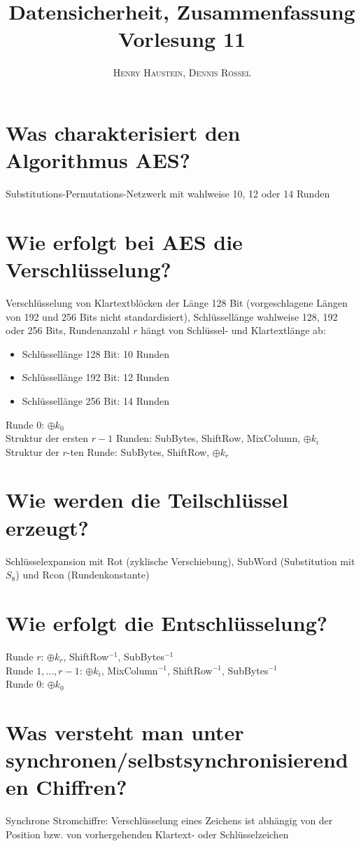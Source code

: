 \documentclass{article}
\title{\textbf{Datensicherheit, Zusammenfassung Vorlesung 11}}
\author{\textsc{Henry Haustein}, \textsc{Dennis Rössel}}
\date{}
\begin{document}
	\maketitle

	\section*{Was charakterisiert den Algorithmus AES?}
	Substitutions-Permutations-Netzwerk mit wahlweise 10, 12 oder 14 Runden
	
	\section*{Wie erfolgt bei AES die Verschlüsselung?}
	Verschlüsselung von Klartextblöcken der Länge 128 Bit (vorgeschlagene Längen von 192 und 256 Bits nicht standardisiert), Schlüssellänge wahlweise 128, 192 oder 256 Bits, Rundenanzahl $r$ hängt von Schlüssel- und Klartextlänge ab:
	\begin{itemize}
		\item Schlüssellänge 128 Bit: 10 Runden
		\item Schlüssellänge 192 Bit: 12 Runden
		\item Schlüssellänge 256 Bit: 14 Runden
	\end{itemize}
	
	Runde 0: $\oplus k_0$ \\
	Struktur der ersten $r-1$ Runden: SubBytes, ShiftRow, MixColumn, $\oplus k_i$ \\
	Struktur der $r$-ten Runde: SubBytes, ShiftRow, $\oplus k_r$
	
	\section*{Wie werden die Teilschlüssel erzeugt?}
	Schlüsselexpansion mit Rot (zyklische Verschiebung), SubWord (Substitution mit $S_8$) und Rcon (Rundenkonstante) 
	
	\section*{Wie erfolgt die Entschlüsselung?}
	Runde $r$: $\oplus k_r$, ShiftRow$^{-1}$, SubBytes$^{-1}$ \\
	Runde $1,...,r-1$: $\oplus k_i$, MixColumn$^{-1}$, ShiftRow$^{-1}$, SubBytes$^{-1}$ \\
	Runde 0: $\oplus k_0$
	
	\section*{Was versteht man unter synchronen/selbstsynchronisierenden Chiffren?}
	Synchrone Stromchiffre: Verschlüsselung eines Zeichens ist abhängig von der Position bzw. von vorhergehenden Klartext- oder Schlüsselzeichen
	
\end{document}
